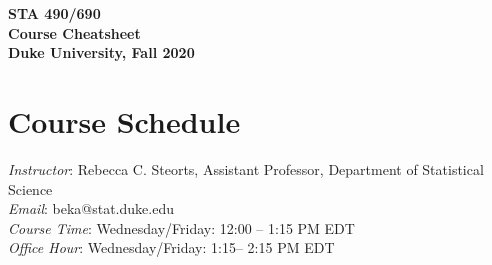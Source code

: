 \documentclass[11pt]{article}
\date{}
\begin{document}
\begin{center}
{\Large\bf STA 490/690\\ Course Cheatsheet} \\

{\Large\bf Duke University, Fall 2020} \\
\end{center}


\section{Course Schedule}
\emph{Instructor}: Rebecca C. Steorts,  Assistant Professor,  Department of Statistical Science\\
\emph{Email}: beka@stat.duke.edu\\
\emph{Course Time}: Wednesday/Friday: 12:00 -- 1:15 PM EDT \\
\emph{Office Hour}: Wednesday/Friday: 1:15-- 2:15 PM EDT \\


\end{document}
